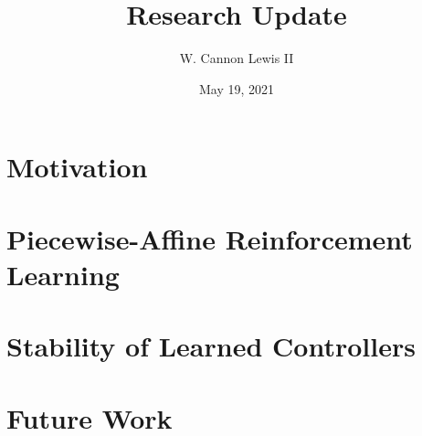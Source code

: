 \documentclass{beamer}
\title{Research Update}
\author{W. Cannon Lewis II}
\date{May 19, 2021}
\begin{document}
\begin{frame}
  \titlepage
\end{frame}

\section{Motivation}

\section{Piecewise-Affine Reinforcement Learning}

\section{Stability of Learned Controllers}

\section{Future Work}
\end{document}
